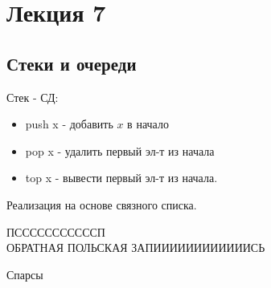 \section{Лекция 7}
\subsection{Стеки и очереди}
\begin{definition}
Стек - СД:
\begin{itemize}
  \item push x - добавить $x$ в начало
  \item pop x - удалить первый эл-т из начала
  \item top x - вывести первый эл-т из начала.
\end{itemize}
\end{definition}
Реализация на основе связного списка.

ПСССССССССССП \\

ОБРАТНАЯ ПОЛЬСКАЯ ЗАПИИИИИИИИИИИИСЬ

Спарсы
